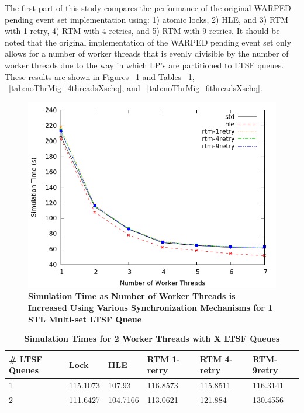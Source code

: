 \documentclass[a4paper]{article}
\begin{document}
The first part of this study compares the performance of the original WARPED
pending event set implementation using: 1) atomic locks, 2) HLE, and 3) RTM with
1 retry, 4) RTM with 4 retries, and 5) RTM with 9 retries.  It should be noted
that the original implementation of the WARPED pending event set only allows for
a number of worker threads that is evenly divisible by the number of worker
threads due to the way in which LP's are partitioned to LTSF queues.  These
results are shown in Figures ~\ref{fig:noThrMig_timeVSthreads_1schq} and Tables
~\ref{tab:noThrMig_2threadsXschq}, ~\ref{tab:noThrMig_4threadsXschq}, and
~\ref{tab:noThrMig_6threadsXschq}.\par

\begin{figure}[H]
    \centering
    \graphicspath{ {./figures/} }
    \includegraphics[width=\textwidth,height=\textheight,keepaspectratio]{noThrMig-summary-multiset-hugeepidemicsim-timeVSthreads-1schQ}
    \caption{\textbf{Simulation Time as Number of Worker Threads is Increased
    Using Various Synchronization Mechanisms for 1 STL Multi-set LTSF Queue}}
    \label{fig:noThrMig_timeVSthreads_1schq}
\end{figure}

\begin{table}[H]
    \centering
    \begin{tabular}{l|p{2cm}|p{2cm}|p{2cm}|p{2cm}|p{2cm}}
        \textbf{\# LTSF Queues}&Lock &HLE &RTM 1-retry &RTM 4-retry &RTM-9retry \\
        \hline
        \midrule
            1 &115.1073 &107.93   &116.8573 &115.8511 &116.3141 \\ 
            2 &111.6427 &104.7166 &113.0621 &121.884  &130.4556   
    \end{tabular}
    \caption{\textbf{Simulation Times for 2 Worker Threads with X LTSF Queues}}
    \label{tab:noThrMig_2threadsXschq}
\end{table}
\end{document}
